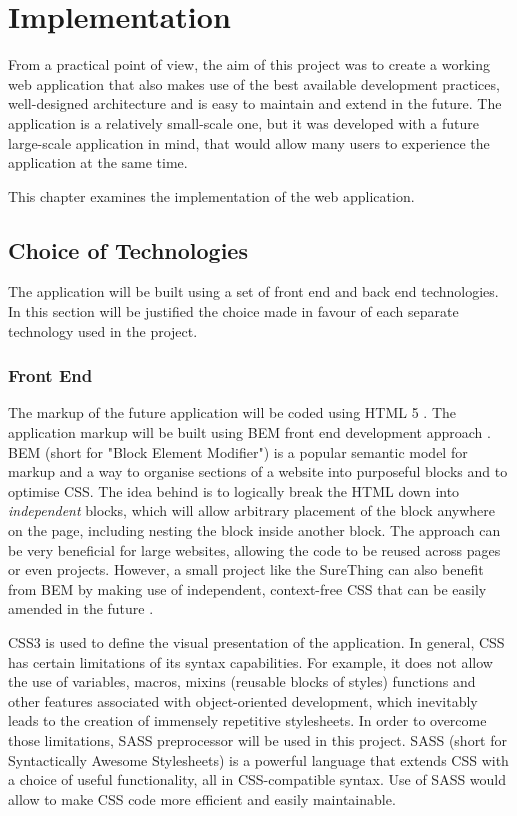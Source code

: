\chapter{Implementation}
\label{ch:implementation}
From a practical point of view, the aim of this project was to create a working web application that also makes use of the best available development practices, well-designed architecture and is easy to maintain and extend in the future. The application is a relatively small-scale one, but it was developed with a future large-scale application in mind, that would allow many users to experience the application at the same time.

This chapter examines the implementation of the web application.

\section{Choice of Technologies}
\label{sec:choiceoftechnologies}
The application will be built using a set of front end and back end technologies. In this section will be justified the choice made in favour of each separate technology used in the project. 

\subsection{Front End}
The markup of the future application will be coded using HTML 5 \cite{documentation:HTML}. The application markup will be built using BEM front end development approach \cite{bem}. BEM (short for "Block Element Modifier") is a popular semantic model for markup and a way to organise sections of a website into purposeful blocks and to optimise CSS. The idea behind is to logically break the HTML down into \emph{independent} blocks, which will allow arbitrary placement of the block anywhere on the page, including nesting the block inside another block. The approach can be  very beneficial for large websites, allowing the code to be reused across pages or even projects. However, a small project like the SureThing can also benefit from BEM by making use of independent, context-free CSS that can be easily amended in the future \cite{article:BEMForSmallProjects}.

CSS3 is used to define the visual presentation of the application. In general, CSS has certain limitations of its syntax capabilities. For example, it does not allow the use of variables, macros, mixins (reusable blocks of styles) functions and other features associated with object-oriented development, which inevitably leads to the creation of immensely repetitive stylesheets. In order to overcome those limitations, SASS preprocessor \cite{sass} will be used in this project. SASS (short for Syntactically Awesome Stylesheets) is a powerful language that extends CSS with a choice of useful functionality, all in CSS-compatible syntax. Use of SASS would allow to make CSS code more efficient and easily maintainable. 

